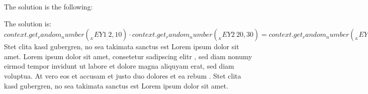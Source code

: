 The solution is the following:
\begin{Solution}
\solitem The solution is: ${{context.get_random_number(__KEY1__, 2, 10)}} \cdot {{context.get_random_number(__KEY2__, 20, 30)}} = {{context.get_random_number(__KEY1__, 2, 10) * context.get_random_number(__KEY2__, 20, 30)}}$
\solitem Stet clita kasd gubergren, no sea takimata sanctus est Lorem ipsum dolor sit amet. Lorem ipsum dolor sit amet, consetetur sadipscing elitr , sed diam nonumy eirmod tempor invidunt ut labore et dolore magna aliquyam erat, sed diam voluptua. 
\solitem At vero eos et accusam et justo duo dolores et ea rebum . Stet clita kasd gubergren, no sea takimata sanctus est Lorem ipsum dolor sit amet. 
\end{Solution}